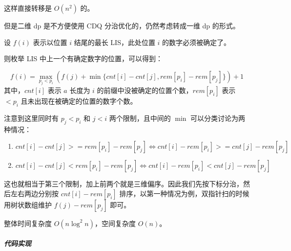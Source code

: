 这样直接转移是 \(O(n^2)\) 的。

但是二维 dp 是不方便使用 CDQ 分治优化的，仍然考虑转成一维 dp 的形式。

设 \(f(i)\) 表示以位置 \(i\) 结尾的最长 LIS，此处位置 \(i\)
的数字必须被确定了。

则枚举 LIS 中上一个有确定数字的位置，可以得到：

\[
f(i)=\max_{p_j\lt p_i}(f(j)+\min\{cnt[i]-cnt[j],rem[p_i]-rem[p_j]\})+1
\] 其中，\(cnt[i]\) 表示 \(a\) 长度为 \(i\)
的前缀中没被确定的位置个数，\(rem[p_i]\) 表示 \(< p_i\)
且未出现在被确定的位置的数字个数。

注意到这里同时有 \(p_j<p_i\) 和 \(j<i\) 两个限制，且中间的 \(\min\)
可以分类讨论为两种情况：

\begin{enumerate}
\def\labelenumi{\arabic{enumi}.}
\tightlist
\item
  \(cnt[i]-cnt[j]>=rem[p_i]-rem[p_j] \iff cnt[i]-rem[p_i]>=cnt[j]-rem[p_j]\)
\item
  \(cnt[i]-cnt[j]<rem[p_i]-rem[p_j] \iff cnt[i]-rem[p_i]<cnt[j]-rem[p_j]\)
\end{enumerate}

这也就相当于第三个限制，加上前两个就是三维偏序。因此我们先按下标分治，然后左右两边分别按
\(cnt[i]-rem[p_i]\) 排序，以第一种情况为例，双指针扫的时候用树状数组维护
\(f(j)-rem[p_j]\) 即可。

整体时间复杂度 \(O(n \log^2 n)\)，空间复杂度 \(O(n)\)。

\subparagraph{代码实现}

